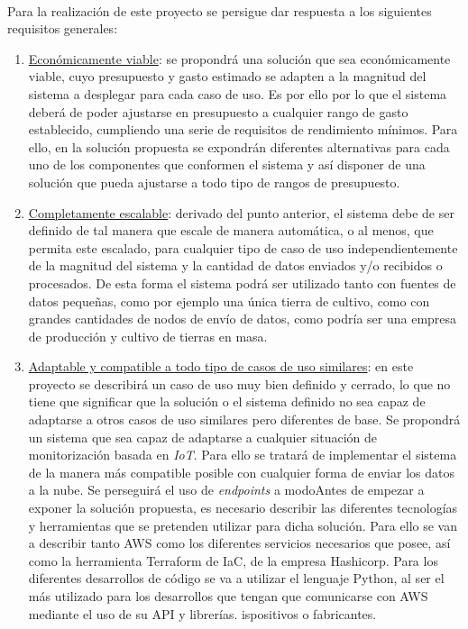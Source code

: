 \documentclass[../../memoria.tex]{subfiles}
\begin{document}
\paragraph{}
Para la realización de este proyecto se persigue dar respuesta a los siguientes requisitos generales:

\begin{enumerate}
  \item \uline{Económicamente viable}: se propondrá una solución que sea económicamente viable, cuyo presupuesto y gasto estimado se adapten a la magnitud del sistema a desplegar para cada caso de uso. Es por ello por lo que el sistema deberá de poder ajustarse en presupuesto a cualquier rango de gasto establecido, cumpliendo una serie de requisitos de rendimiento mínimos. Para ello, en la solución propuesta se expondrán diferentes alternativas para cada uno de los componentes que conformen el sistema y así disponer de una solución que pueda ajustarse a todo tipo de rangos de presupuesto.

  \item \uline{Completamente escalable}: derivado del punto anterior, el sistema debe de ser definido de tal manera que escale de manera automática, o al menos, que permita este escalado, para cualquier tipo de caso de uso independientemente de la magnitud del sistema y la cantidad de datos enviados y/o recibidos o procesados. De esta forma el sistema podrá ser utilizado tanto con fuentes de datos pequeñas, como por ejemplo una única tierra de cultivo, como con grandes cantidades de nodos de envío de datos, como podría ser una empresa de producción y cultivo de tierras en masa.

  \item \uline{Adaptable y compatible a todo tipo de casos de uso similares}: en este proyecto se describirá un caso de uso muy bien definido y cerrado, lo que no tiene que significar que la solución o el sistema definido no sea capaz de adaptarse a otros casos de uso similares pero diferentes de base. Se propondrá un sistema que sea capaz de adaptarse a cualquier situación de monitorización basada en \textit{IoT}. Para ello se tratará de implementar el sistema de la manera más compatible posible con cualquier forma de enviar los datos a la nube. Se perseguirá el uso de \textit{endpoints} a modoAntes de empezar a exponer la solución propuesta, es necesario describir las diferentes tecnologías y herramientas que se pretenden utilizar para dicha solución. Para ello se van a describir tanto AWS como los diferentes servicios necesarios que posee, así como la herramienta Terraform de IaC, de la empresa Hashicorp. Para los diferentes desarrollos de código se va a utilizar el lenguaje Python, al ser el más utilizado para los desarrollos que tengan que comunicarse con AWS mediante el uso de su API y librerías. ispositivos o fabricantes.


\end{enumerate}
\end{document}
